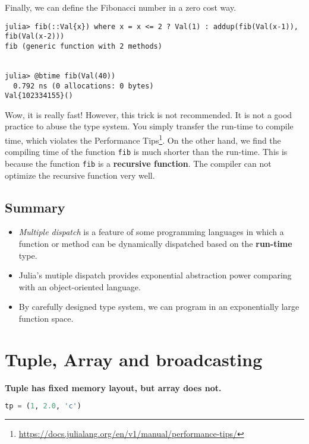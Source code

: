\documentclass[
  notoc %
]{tufte-book}
\DeclareRobustCommand{\href}[2]{#2\footnote{\url{#1}}}
\providecommand{\tightlist}{%
  \setlength{\itemsep}{0pt}\setlength{\parskip}{0pt}
}
\newcommand{\passthrough}[1]{#1}
\begin{document}
Finally, we can define the Fibonacci number in a zero cost way.

\begin{lstlisting}
julia> fib(::Val{x}) where x = x <= 2 ? Val(1) : addup(fib(Val(x-1)), fib(Val(x-2)))
fib (generic function with 2 methods)


julia> @btime fib(Val(40))
  0.792 ns (0 allocations: 0 bytes)
Val{102334155}()
\end{lstlisting}

Wow, it is really fast! However, this trick is not recommended. It is
not a good practice to abuse the type system. You simply transfer the
run-time to compile time, which violates the
\href{https://docs.julialang.org/en/v1/manual/performance-tips/}{Performance
Tips}. On the other hand, we find the compiling time of the function
\passthrough{\lstinline!fib!} is much shorter than the run-time. This is
because the function \passthrough{\lstinline!fib!} is a
\textbf{recursive function}. The compiler can not optimize the recursive
function very well.

\hypertarget{summary}{%
\subsection{Summary}\label{summary}}

\begin{itemize}
\tightlist
\item
  \emph{Multiple dispatch} is a feature of some programming languages in
  which a function or method can be dynamically dispatched based on the
  \textbf{run-time} type.
\item
  Julia's mutiple dispatch provides exponential abstraction power
  comparing with an object-oriented language.
\item
  By carefully designed type system, we can program in an exponentially
  large function space.
\end{itemize}

\hypertarget{tuple-array-and-broadcasting}{%
\section{Tuple, Array and
broadcasting}\label{tuple-array-and-broadcasting}}

\textbf{Tuple has fixed memory layout, but array does not.}

\begin{lstlisting}[language=Julia]
tp = (1, 2.0, 'c')
\end{lstlisting}
\end{document}
